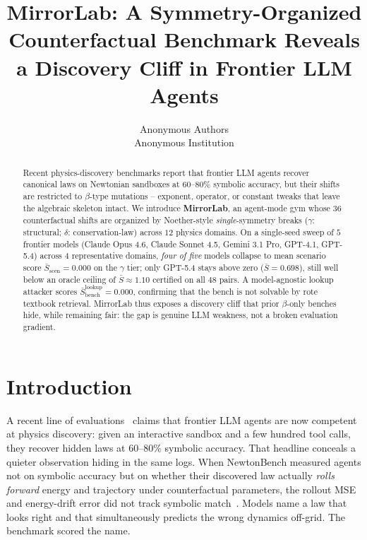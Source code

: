 \documentclass{article}
\title{MirrorLab: A Symmetry-Organized Counterfactual Benchmark Reveals a
       Discovery Cliff in Frontier LLM Agents}
\author{Anonymous Authors \\ Anonymous Institution}
\date{}
\begin{document}
\maketitle

\begin{abstract}
Recent physics-discovery benchmarks report that frontier LLM agents recover
canonical laws on Newtonian sandboxes at $60$--$80\%$ symbolic accuracy, but
their shifts are restricted to $\beta$-type mutations -- exponent, operator,
or constant tweaks that leave the algebraic skeleton intact. We introduce
\textbf{MirrorLab}, an agent-mode gym whose $36$ counterfactual shifts are
organized by Noether-style \emph{single}-symmetry breaks ($\gamma$:
structural; $\delta$: conservation-law) across $12$ physics domains. On a
single-seed sweep of $5$ frontier models (Claude Opus 4.6, Claude Sonnet
4.5, Gemini 3.1 Pro, GPT-4.1, GPT-5.4) across $4$ representative domains,
\emph{four of five} models collapse to mean scenario score
$\bar S_{\mathrm{scen}}=0.000$ on the $\gamma$ tier; only GPT-5.4 stays
above zero ($\bar S=0.698$), still well below an oracle ceiling of
$\bar S \approx 1.10$ certified on all $48$ pairs. A model-agnostic
lookup attacker scores $\bar S_{\mathrm{bench}}^{\mathrm{lookup}}=0.000$,
confirming that the bench is not solvable by rote textbook retrieval.
MirrorLab thus exposes a discovery cliff that prior $\beta$-only benches
hide, while remaining fair: the gap is genuine LLM weakness, not a
broken evaluation gradient.
\end{abstract}

\section{Introduction}
\label{sec:intro}

A recent line of evaluations~\citep{newtonbench, physgym, boxinggym} claims
that frontier LLM agents are now competent at physics discovery: given an
interactive sandbox and a few hundred tool calls, they recover hidden laws
at $60$--$80\%$ symbolic accuracy. That headline conceals a quieter
observation hiding in the same logs. When NewtonBench measured agents not
on symbolic accuracy but on whether their discovered law actually
\emph{rolls forward} energy and trajectory under counterfactual parameters,
the rollout MSE and energy-drift error did not track symbolic
match~\citep{r5elegant}. Models name a law that looks right and that
simultaneously predicts the wrong dynamics off-grid. The benchmark scored
the name.
\end{document}
